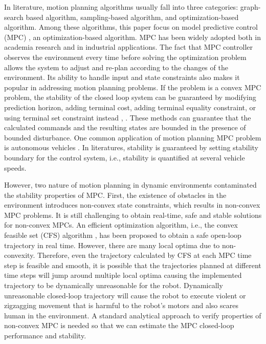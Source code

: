 \documentclass[letterpaper, 10 pt, conference]{ieeeconf}  %
\begin{document}
In literature, motion planning algorithms usually fall into three categories: graph-search based algorithm, sampling-based algorithm, and optimization-based algorithm. Among these algorithms, this paper focus on model predictive control (MPC) \cite{rawlings1999tutorial}, an optimization-based algorithm. MPC has been widely adopted both in academia research and in industrial applications. The fact that MPC controller observes the environment every time before solving the optimization problem allows the system to adjust and re-plan according to the changes of the environment. Its ability to handle input and state constraints also makes it popular in addressing motion planning problems. If the problem is a convex MPC problem, the stability of the closed loop system can be guaranteed by modifying prediction horizon, adding terminal cost, adding terminal equality constraint, or using terminal set constraint instead \cite{mayne2000constrained}, \cite{limon2006stability}. These methods can guarantee that the calculated commands and the resulting states are bounded in the presence of bounded disturbance. One common application of motion planning MPC problem is autonomous vehicles \cite{borrelli2005mpc}. In literatures, stability is guaranteed by setting stability boundary for the control system, i.e., stability is quantified at several vehicle speeds.

However, two nature of motion planning in dynamic environments contaminated the stability properties of MPC. First, the existence of obstacles in the environment introduces non-convex state constraints, which results in non-convex MPC problems. It is still challenging to obtain real-time, safe and stable solutions for non-convex MPCs. An efficient optimization algorithm, i.e., the convex feasible set (CFS) algorithm \cite{liu2018convex}, has been proposed to obtain a safe open-loop trajectory in real time. However, there are many local optima due to non-convexity. Therefore, even the trajectory calculated by CFS at each MPC time step is feasible and smooth, it is possible that the trajectories planned at different time steps will jump around multiple local optima causing the implemented trajectory to be dynamically unreasonable for the robot. Dynamically unreasonable closed-loop trajectory will cause the robot to execute violent or zigzagging movement that is harmful to the robot's motors and also scares human in the environment. A standard analytical approach to verify properties of non-convex MPC is needed so that we can estimate the MPC closed-loop performance and stability. 
\end{document}
